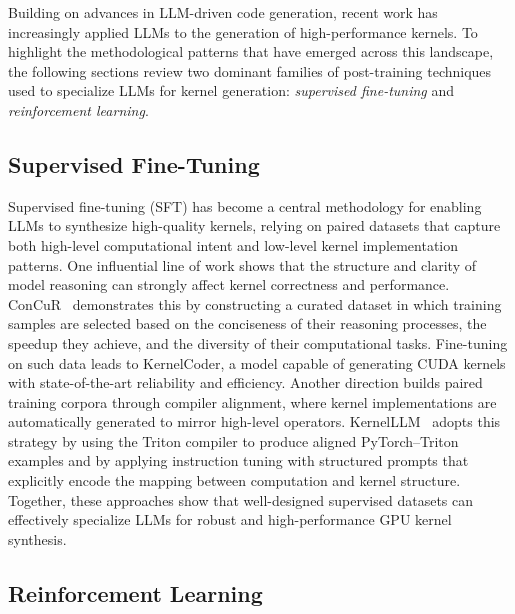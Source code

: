 Building on advances in LLM-driven code generation, recent work has increasingly applied LLMs to the generation of high-performance kernels. To highlight the methodological patterns that have emerged across this landscape, the following sections review two dominant families of post-training techniques used to specialize LLMs for kernel generation: \emph{supervised fine-tuning} and \emph{reinforcement learning}.

\subsection{Supervised Fine-Tuning}

Supervised fine-tuning (SFT) has become a central methodology for enabling LLMs to synthesize high-quality kernels, relying on paired datasets that capture both high-level computational intent and low-level kernel implementation patterns. 
One influential line of work shows that the structure and clarity of model reasoning can strongly affect kernel correctness and performance. ConCuR~\cite{DBLP:journals/corr/abs-2510-07356} demonstrates this by constructing a curated dataset in which training samples are selected based on the conciseness of their reasoning processes, the speedup they achieve, and the diversity of their computational tasks. Fine-tuning on such data leads to KernelCoder, a model capable of generating CUDA kernels with state-of-the-art reliability and efficiency. Another direction builds paired training corpora through compiler alignment, where kernel implementations are automatically generated to mirror high-level operators. KernelLLM~\cite{kernelllm2025} adopts this strategy by using the Triton compiler to produce aligned PyTorch–Triton examples and by applying instruction tuning with structured prompts that explicitly encode the mapping between computation and kernel structure.  Together, these approaches show that well-designed supervised datasets can effectively specialize LLMs for robust and high-performance GPU kernel synthesis.


\subsection{Reinforcement Learning}

